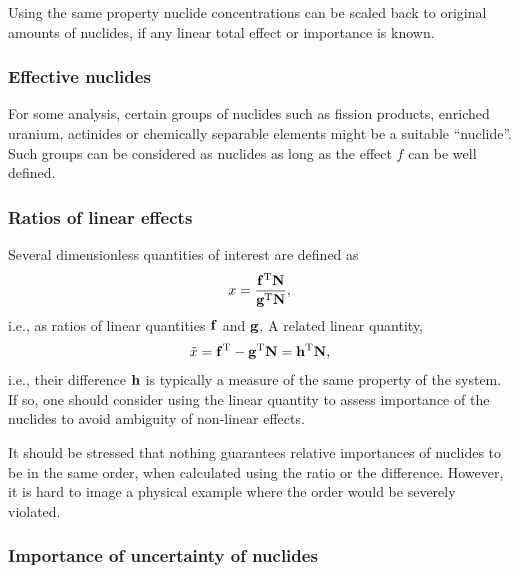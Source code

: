 Using the same property nuclide concentrations can be scaled back to original amounts of nuclides, if any linear total effect or importance is known.

\subsubsection*{Effective nuclides}

For some analysis, certain groups of nuclides such as fission products, enriched uranium, actinides or chemically separable elements might be a suitable ``nuclide''. Such groups can be considered as nuclides as long as the effect $f$ can be well defined.



\subsubsection*{Ratios of linear effects}

Several dimensionless quantities of interest are defined as
%
\begin{gather}
x = \frac{\mathbf{f}^{\mathrm{T}}\mathbf{N}}{\mathbf{g}^{\mathrm{T}}\mathbf{N}},
\end{gather}
%
i.e., as ratios of linear quantities $\mathbf{f}$ and $\mathbf{g}$. A related linear quantity,
%
\begin{gather}
\tilde{x} = \mathbf{f}^{\mathrm{T}}-\mathbf{g}^{\mathrm{T}}\mathbf{N} = \mathbf{h}^{\mathrm{T}}\mathbf{N},
\end{gather}
%
i.e., their difference $\mathbf{h}$ is typically a measure of the same property of the system. If so, one should consider using the linear quantity to assess importance of the nuclides to avoid ambiguity of non-linear effects.

It should be stressed that nothing guarantees relative importances of nuclides to be in the same order, when calculated using the ratio or the difference. However, it is hard to image a physical example where the order would be severely violated.

\subsubsection*{Importance of uncertainty of nuclides}


